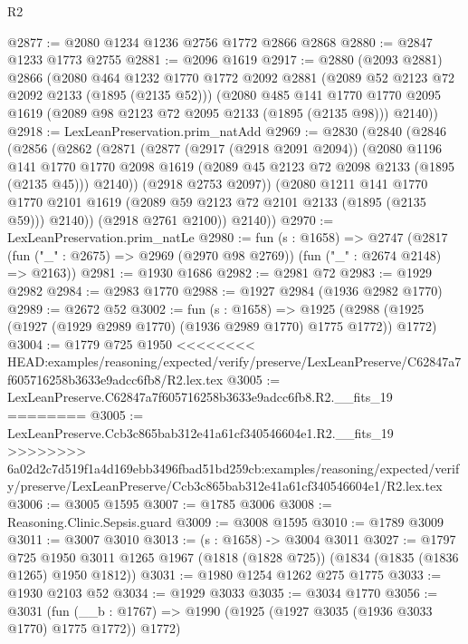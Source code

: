 \begin{lexlean}{R2}
\begin{coremodule}
{{{{{{{{{{{{{{{{{{{{{{{{{{{{{{{{{{{{{{{{{{{{{{{{{{{{{{{{{{{{{{{{{{{{{{{{{{{{{{{{{{{{{{{{{{{{@2877 := @2080 @1234 @1236 @2756 @1772 @2866 @2868
@2880 := @2847 @1233 @1773 @2755
@2881 := @2096 @1619
@2917 := @2880
    (@2093 @2881)
    @2866
    (@2080
      @464
      @1232
      @1770
      @1772
      @2092
      @2881
      (@2089 @52 @2123 @72 @2092 @2133 (@1895 (@2135 @52)))
      (@2080
        @485
        @141
        @1770
        @1770
        @2095
        @1619
        (@2089 @98 @2123 @72 @2095 @2133 (@1895 (@2135 @98)))
        @2140))
@2918 := LexLeanPreservation.prim_natAdd
@2969 := @2830
    (@2840
      (@2846
        (@2856
          (@2862
            (@2871
              (@2877
                (@2917 (@2918 @2091 @2094))
                (@2080
                  @1196
                  @141
                  @1770
                  @1770
                  @2098
                  @1619
                  (@2089 @45 @2123 @72 @2098 @2133 (@1895 (@2135 @45)))
                  @2140))
              (@2918 @2753 @2097))
            (@2080
              @1211
              @141
              @1770
              @1770
              @2101
              @1619
              (@2089 @59 @2123 @72 @2101 @2133 (@1895 (@2135 @59)))
              @2140))
          (@2918 @2761 @2100))
        @2140))
@2970 := LexLeanPreservation.prim_natLe
@2980 := fun (s : @1658) =>
  @2747 (@2817 (fun ("_" : @2675) => @2969 (@2970 @98 @2769)) (fun ("_" : @2674 @2148) => @2163))
@2981 := @1930 @1686
@2982 := @2981 @72
@2983 := @1929 @2982
@2984 := @2983 @1770
@2988 := @1927 @2984 (@1936 @2982 @1770)
@2989 := @2672 @52
@3002 := fun (s : @1658) =>
  @1925 (@2988 (@1925 (@1927 (@1929 @2989 @1770) (@1936 @2989 @1770) @1775 @1772)) @1772)
@3004 := @1779 @725 @1950
<<<<<<<< HEAD:examples/reasoning/expected/verify/preserve/LexLeanPreserve/C62847a7f605716258b3633e9adcc6fb8/R2.lex.tex
@3005 := LexLeanPreserve.C62847a7f605716258b3633e9adcc6fb8.R2.__fits_19
========
@3005 := LexLeanPreserve.Ccb3c865bab312e41a61cf340546604e1.R2.__fits_19
>>>>>>>> 6a02d2c7d519f1a4d169ebb3496fbad51bd259cb:examples/reasoning/expected/verify/preserve/LexLeanPreserve/Ccb3c865bab312e41a61cf340546604e1/R2.lex.tex
@3006 := @3005 @1595
@3007 := @1785 @3006
@3008 := Reasoning.Clinic.Sepsis.guard
@3009 := @3008 @1595
@3010 := @1789 @3009
@3011 := @3007 @3010
@3013 := (s : @1658) -> @3004 @3011
@3027 := @1797
    @725
    @1950
    @3011
    @1265
    @1967
    (@1818 (@1828 @725))
    (@1834 (@1835 (@1836 @1265) @1950 @1812))
@3031 := @1980 @1254 @1262 @275 @1775
@3033 := @1930 @2103 @52
@3034 := @1929 @3033
@3035 := @3034 @1770
@3056 := @3031
    (fun (__b : @1767) => @1990 (@1925 (@1927 @3035 (@1936 @3033 @1770) @1775 @1772)) @1772)
}}}}}}}}}}}}}}}}}}}}}}}}}}}}}}}}}}}}}}}}}}}}}}}}}}}}}}}}}}}}}}}}}}}}}}}}}}}}}}}}}}}}}}}}}}}}
\end{coremodule}
\end{lexlean}

